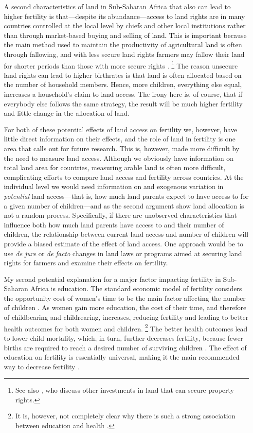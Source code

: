 \documentclass[letterpaper,12pt]{article}
\begin{document}
A second characteristics of land in Sub-Saharan Africa that also can
lead to higher fertility is that---despite its abundance---access to
land rights are in many countries controlled at the local level by 
chiefs and other local institutions rather than through market-based 
buying and selling of land.
This is important because the main method used to maintain the 
productivity of agricultural land is often through fallowing, and with less
secure land rights farmers may fallow their land for shorter periods
than those with more secure rights \citep{Goldstein2008}.%
\footnote{
See also \citet{besley95c}, who discuss other investments in land that
can secure property rights.}
The reason unsecure land rights can lead to higher birthrates is that
land is often allocated based on the number of household members.
Hence, more children, everything else equal, increases a household's 
claim to land access.
The irony here is, of course, that if everybody else follows the same
strategy, the result will be much higher fertility and little change in
the allocation of land.

For both of these potential effects of land access on fertility we,
however, have little direct information on their effects, and the role
of land in fertility is one area that calls out for future research.
This is, however, made more difficult by the need to measure land access.
Although we obviously have information on total land area for countries,
measuring arable land is often more difficult, complicating efforts to
compare land access and fertility across countries.
At the individual level we would need information on and exogenous
variation in \emph{potential} land access---that is, how much land 
parents expect to have access to for a given number of children---and 
as the second argument show land allocation is not a random process.
Specifically, if there are unobserved characteristics that influence
both how much land parents have access to and their number of children,
the relationship between current land access and number of children 
will provide a biased estimate of the effect of land access.
One approach would be to use \emph{de jure} or \emph{de facto} changes 
in land laws or programs aimed at securing land rights for farmers 
and examine their effects on fertility.

My second potential explanation for a major factor impacting fertility in
Sub-Saharan Africa is education.
The standard economic model of fertility considers the opportunity cost
of women's time to be the main factor affecting the number of children
\citep{becker91}.
As women gain more education, the cost of their time, and therefore of
childbearing and childrearing, increases, reducing fertility and leading
to better health outcomes for both women and children.%
\footnote{
It is, however, not completely clear why there is such a strong
association between education and health
\citep{Thomas1991,Glewwe1999,Kovsted2002}.} 
The better health outcomes lead to lower child mortality, which, in turn, 
further decreases fertility, because fewer births are required to reach 
a desired number of surviving children \citep{Ainsworth1996}.
The effect of education on fertility is essentially universal, making it
the main recommended way to decrease fertility \citep{schultz02}.
\end{document}
